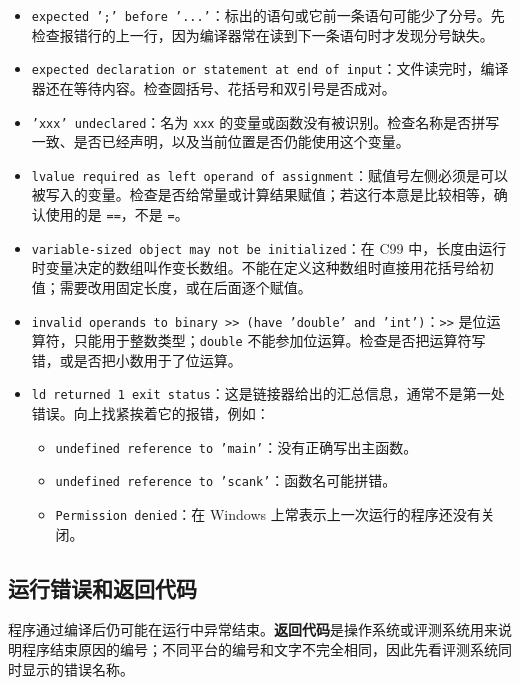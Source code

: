 \documentclass[UTF8,zihao=-4,fontset=windows]{ctexart}
\newcommand{\term}[1]{\textbf{\color{navy}#1}}
\begin{document}
\begin{itemize}
  \item \texttt{expected ';' before '...'}：标出的语句或它前一条语句可能少了分号。先检查报错行的上一行，因为编译器常在读到下一条语句时才发现分号缺失。
  \item \texttt{expected declaration or statement at end of input}：文件读完时，编译器还在等待内容。检查圆括号、花括号和双引号是否成对。
  \item \texttt{'xxx' undeclared}：名为 \verb|xxx| 的变量或函数没有被识别。检查名称是否拼写一致、是否已经声明，以及当前位置是否仍能使用这个变量。
  \item \texttt{lvalue required as left operand of assignment}：赋值号左侧必须是可以被写入的变量。检查是否给常量或计算结果赋值；若这行本意是比较相等，确认使用的是 \verb|==|，不是 \verb|=|。
  \item \texttt{variable-sized object may not be initialized}：在 C99 中，长度由运行时变量决定的数组叫作变长数组。不能在定义这种数组时直接用花括号给初值；需要改用固定长度，或在后面逐个赋值。
  \item \texttt{invalid operands to binary >> (have 'double' and 'int')}：\verb|>>| 是位运算符，只能用于整数类型；\verb|double| 不能参加位运算。检查是否把运算符写错，或是否把小数用于了位运算。
  \item \texttt{ld returned 1 exit status}：这是链接器给出的汇总信息，通常不是第一处错误。向上找紧挨着它的报错，例如：
  \begin{itemize}
    \item \texttt{undefined reference to 'main'}：没有正确写出主函数。
    \item \texttt{undefined reference to 'scank'}：函数名可能拼错。
    \item \texttt{Permission denied}：在 Windows 上常表示上一次运行的程序还没有关闭。
  \end{itemize}
\end{itemize}

\subsection{运行错误和返回代码}

程序通过编译后仍可能在运行中异常结束。\term{返回代码}是操作系统或评测系统用来说明程序结束原因的编号；不同平台的编号和文字不完全相同，因此先看评测系统同时显示的错误名称。
\end{document}
